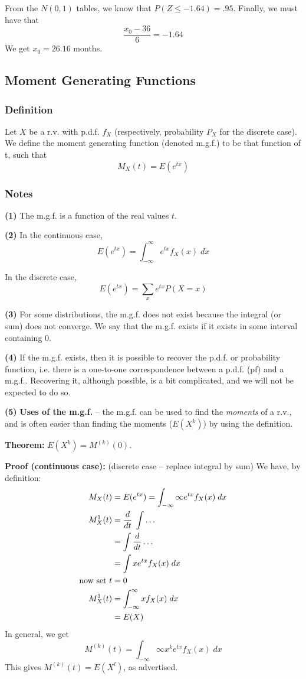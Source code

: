 \documentclass[12pt]{article}
\begin{document}
From the $N(0,1)$ tables, we know that $P(Z \leq -1.64) = .95$. Finally, we must have that
\[
    \frac{x_0 - 36}{6} = -1.64
\]
We get $x_0 = 26.16$ months.

\subsection{Moment Generating Functions}
\subsubsection{Definition}
Let $X$ be a r.v. with p.d.f. $f_X$ (respectively, probability $P_X$ for the discrete case). We define the moment generating function (denoted m.g.f.) to be that function of t, such that
\[
    M_X (t) = E ( e^{tx} )
\]

\subsubsection{Notes}
\textbf{(1)} The m.g.f. is a function of the real values $t$.

\textbf{(2)} In the continuous case, 
\[
    E(e^{tx}) = \int_{-\infty}^{\infty} e^{tx} f_X (x) \; dx
\]

In the discrete case,
\[
    E(e^{tx}) = \sum_x e^{tx} P(X = x)
\]

\textbf{(3)} For some distributions, the m.g.f. does not exist because the integral (or sum) does not converge. We say that the m.g.f. exists if it exists in some interval containing 0. 

\textbf{(4)} If the m.g.f. exists, then it is possible to recover the p.d.f. or probability function, i.e. there is a one-to-one correspondence between a p.d.f. (pf) and a m.g.f.. Recovering it, although possible, is a bit complicated, and we will not be expected to do so.

\textbf{(5)} \textbf{Uses of the m.g.f.} -- the m.g.f. can be used to find the \emph{moments} of a r.v., and is often easier than finding the moments ($E(X^k)$) by using the definition. 

\textbf{Theorem:} $E(X^k) = M^{(k)} (0)$.

\textbf{Proof (continuous case):} (discrete case -- replace integral by sum) We have, by definition:
\begin{align*}
   M_X (t) &= E(e^{tx}) = \int_{-\infty}{\infty} e^{tx} f_X (x) \; dx \\
   M_X^1 (t) &= \frac{d}{dt} \; \int \ldots \\
    &= \int \frac{d}{dt} \ldots \\
    &= \int x e^{tx} f_X (x) \; dx \\
   \textnormal{now set } t &= 0 \\
   M_X^1 (t) &= \int_{-\infty}^{\infty} x f_X (x) \; dx \\
    &= E(X)
\end{align*}
In general, we get 
\[
    M^{(k)} (t) = \int_{-\infty}{\infty} x^k e^{tx} f_X (x) \; dx
\]
This gives $M^{(k)} (t) = E(X^l)$, as advertised.
\end{document}
